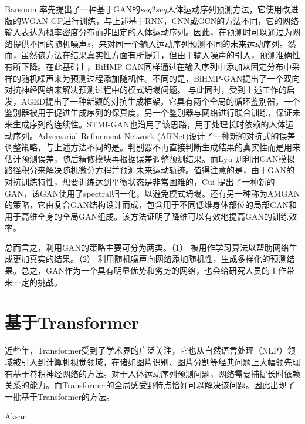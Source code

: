 Barsoum \etal \parencite{barsoum2018hp}率先提出了一种基于GAN的$seq2seq$人体运动序列预测方法，它使用改进版的WGAN-GP进行训练，与上述基于RNN，CNN或GCN的方法不同，它的网络输入表达为概率密度分布而非固定的人体运动序列。因此，在预测时可以通过为网络提供不同的随机噪声$z$，来对同一个输入运动序列预测不同的未来运动序列。然而，虽然该方法在结果真实性方面有所提升，但由于输入噪声的引入，预测准确性有所下降。在此基础上，BiHMP-GAN\parencite{kundu2019bihmp}同样通过在输入序列中添加从固定分布中采样的随机噪声来为预测过程添加随机性。不同的是，BiHMP-GAN提出了一个双向对抗神经网络来解决预测过程中的模式坍塌问题。
与此同时，受到上述工作的启发，AGED\parencite{gui2018adversarial}提出了一种新颖的对抗生成框架，它具有两个全局的循环鉴别器，一个鉴别器被用于促进生成序列的保真度，另一个鉴别器与网络进行联合训练，保证未来生成序列的连续性。STMI-GAN\parencite{hernandez2019human}也沿用了该思路，用于处理长时依赖的人体运动序列。Adversarial Refinement Network (ARNet)\parencite{chao2020adversarial}设计了一种新的对抗式的误差调整策略，与上述方法不同的是。判别器不再直接判断生成结果的真实性而是用来估计预测误差，随后精修模块再根据误差调整预测结果。而Lyu \etal \parencite{lyu2021learning}则利用GAN模拟路径积分来解决随机微分方程并预测未来运动轨迹。值得注意的是，由于GAN的对抗训练特性，想要训练达到平衡状态是非常困难的，Cui \etal\parencite{cui2021efficient}提出了一种新的GAN，该GAN使用了spectral归一化，以避免模式坍塌。还有另一种称为AMGAN\parencite{liu2021aggregated}的策略，它由复合GAN结构设计而成，包含用于不同低维身体部位的局部GAN和用于高维全身的全局GAN组成。该方法证明了降维可以有效地提高GAN的训练效率。

总而言之，利用GAN的策略主要可分为两类。（1） 被用作学习算法以帮助网络生成更加真实的结果。（2） 利用随机噪声向网络添加随机性，生成多样化的预测结果。总之，GAN作为一个具有明显优势和劣势的网络，也会给研究人员的工作带来一定的挑战。
\section{基于Transformer}
近些年，Transformer受到了学术界的广泛关注，它也从自然语言处理（NLP）领域被引入到计算机视觉领域，在诸如图片识别、图片分割等经典问题上大幅领先现有基于卷积神经网络的方法。对于人体运动序列预测问题，网络需要捕捉长时依赖关系的能力。而Transformer的全局感受野特点恰好可以解决该问题。因此出现了一批基于Transformer的方法\parencite{aksan2021spatio, cai2020learning}。

Aksan \etal \parencite{aksan2021spatio}

